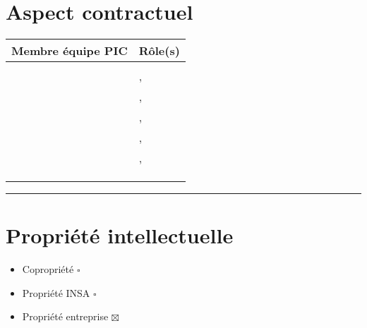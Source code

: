 	\section*{Aspect contractuel}
	
	
	\begin{tabular}[h]{|p{}|p{}|}
	\hline
	
	\cellcolor{gray!40}Membre équipe PIC & \cellcolor{gray!40}Rôle(s) \\\hline
	\Sergi & \CP \\\hline
	\Pierre & \CPA , \RQ \\\hline
	\Michel & \D , \RD \\\hline 
	\Kafui  & \D , \RQA \\\hline
	\Matthieu & \D , \RRS \\\hline
	\Mathieu & \D , \RGC \\\hline
	\Florian & \D \newline \RS \\\hline
	\Melissa  & \D \\\hline
	\Julie & \D \\\hline
	
	
\end{tabular}
	
	\vspace{1cm}
	\noindent\hfil\rule{\textwidth}{.4pt}\hfil
	\vspace{1cm}	
	
	\section*{Propriété intellectuelle}
		\begin{itemize}
			\item Copropriété $\square$
			\item Propriété INSA $\square$
			\item Propriété entreprise $\boxtimes$
		\end{itemize}
	
		
